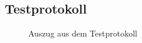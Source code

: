 \subsection{Testprotokoll}
\label{subsec:Testprotokoll}

\begin{figure}[htb]
	\centering
	\caption{Auszug aus dem Testprotokoll}
\end{figure}
